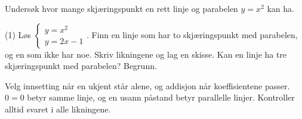 Undersøk hvor mange skjæringspunkt en rett linje og parabelen $y = x^2$ kan ha.
\begin{tasks}(1)
  \task Løs $\begin{cases} y = x^2\\ y = 2x - 1 \end{cases}$. 
  \task Finn en linje som har to skjæringspunkt med parabelen, og en som ikke har noe. Skriv likningene og lag en skisse.
  \task Kan en linje ha tre skjæringspunkt med parabelen? Begrunn.
\end{tasks}

\begin{oppsummering}
Velg innsetting når en ukjent står alene, og addisjon når koeffisientene passer.
$0 = 0$ betyr samme linje, og en usann påstand betyr parallelle linjer.
Kontroller alltid svaret i alle likningene.
\end{oppsummering}
